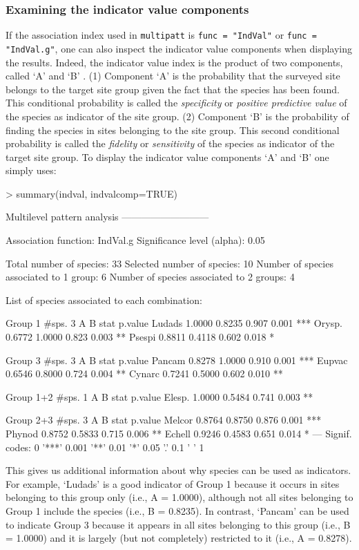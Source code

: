 \documentclass[11pt,a4paper]{article}
\begin{document}
\subsubsection{Examining the indicator value components}
If the association index used in \texttt{multipatt} is \texttt{func = "IndVal"} or \texttt{func = "IndVal.g"}, one can also inspect the indicator value components when displaying the results. Indeed, the indicator value index is the product of two components, called `A' and `B' \citep{Dufrene1997}\citep{DeCaceres2009}. (1) Component `A' is the probability that the surveyed site belongs to the target site group given the fact that the species has been found. This conditional probability is called the \emph{specificity} or \emph{positive predictive value} of the species as indicator of the site group. (2) Component `B' is the probability of finding the species in sites belonging to the site group. This second conditional probability is called the \emph{fidelity} or \emph{sensitivity} of the species as indicator of the target site group. To display the indicator value components `A' and `B' one simply uses:
\begin{Schunk}
\begin{Sinput}
> summary(indval, indvalcomp=TRUE)
\end{Sinput}
\begin{Soutput}
 Multilevel pattern analysis
 ---------------------------

 Association function: IndVal.g
 Significance level (alpha): 0.05

 Total number of species: 33
 Selected number of species: 10 
 Number of species associated to 1 group: 6 
 Number of species associated to 2 groups: 4 

 List of species associated to each combination: 

 Group 1  #sps.  3 
            A      B  stat p.value    
Ludads 1.0000 0.8235 0.907   0.001 ***
Orysp. 0.6772 1.0000 0.823   0.003 ** 
Psespi 0.8811 0.4118 0.602   0.018 *  

 Group 3  #sps.  3 
            A      B  stat p.value    
Pancam 0.8278 1.0000 0.910   0.001 ***
Eupvac 0.6546 0.8000 0.724   0.004 ** 
Cynarc 0.7241 0.5000 0.602   0.010 ** 

 Group 1+2  #sps.  1 
            A      B  stat p.value   
Elesp. 1.0000 0.5484 0.741   0.003 **

 Group 2+3  #sps.  3 
            A      B  stat p.value    
Melcor 0.8764 0.8750 0.876   0.001 ***
Phynod 0.8752 0.5833 0.715   0.006 ** 
Echell 0.9246 0.4583 0.651   0.014 *  
---
Signif. codes:  0 '***' 0.001 '**' 0.01 '*' 0.05 '.' 0.1 ' ' 1 
\end{Soutput}
\end{Schunk}
This gives us additional information about why species can be used as indicators. For example, `Ludads' is a good indicator of Group 1 because it occurs in sites belonging to this group only (i.e., A = 1.0000), although not all sites belonging to Group 1 include the species (i.e., B = 0.8235). In contrast, `Pancam' can be used to indicate Group 3 because it appears in all sites belonging to this group (i.e., B = 1.0000) and it is largely (but not completely) restricted to it (i.e., A = 0.8278).
\end{document}

